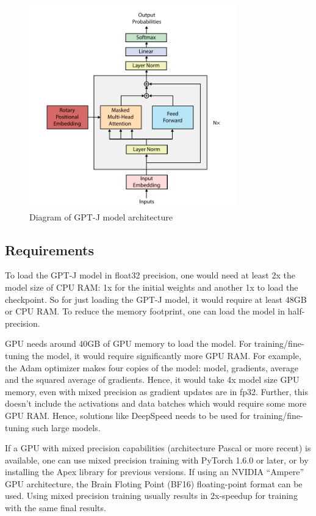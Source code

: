 \begin{figure}[htbp]
    \centering
    \includegraphics[width=0.8\textwidth]{figures/gpt-j_architecture.pdf}
    \caption{Diagram of GPT-J model architecture}
    \label{fig:gpt-j-architecture}
\end{figure}

\subsection{Requirements}
\label{sec:requirements}
To load the GPT-J model in float32 precision, one would need at least 2x the model size of CPU RAM: 1x for the initial weights and another 1x to load the checkpoint. So for just loading the GPT-J model, it would require at least 48GB or CPU RAM. To reduce the memory footprint, one can load the model in half-precision.

GPU needs around 40GB of GPU memory to load the model. For training/fine-tuning the model, it would require significantly more GPU RAM. For example, the Adam optimizer makes four copies of the model: model, gradients, average and the squared average of gradients. Hence, it would take 4x model size GPU memory, even with mixed precision as gradient updates are in fp32. Further, this doesn't include the activations and data batches which would require some more GPU RAM. Hence, solutions like DeepSpeed needs to be used for training/fine-tuning such large models.

If a GPU with mixed precision capabilities (architecture Pascal or more recent) is available, one can use mixed precision training with PyTorch 1.6.0 or later, or by installing the Apex library for previous versions. If using an NVIDIA “Ampere” GPU architecture, the Brain Floting Point (BF16) floating-point format can be used. Using mixed precision training usually results in 2x-speedup for training with the same final results.

